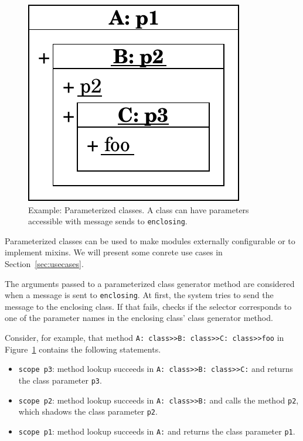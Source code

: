 \begin{figure}
	\includegraphics[scale=0.75]{nested_notation_params.pdf}
	\centering
	\caption[Example: Parameterized classes]{Example: Parameterized classes. A class can have parameters accessible with message sends to \texttt{enclosing}.}
	\label{fig:concept_param_classes}
\end{figure}

Parameterized classes can be used to make modules externally configurable or to implement mixins. We will present some conrete use cases in Section~\ref{sec:usecases}.

The arguments passed to a parameterized class generator method are considered when a message is sent to \texttt{enclosing}. At first, the system tries to send the message to the enclosing class. If that fails, \msname checks if the selector corresponds to one of the parameter names in the enclosing class' class generator method.

Consider, for example, that method \texttt{A: class>>B: class>>C: class>>foo} in Figure~\ref{fig:concept_param_classes} contains the following statements.
\begin{itemize}
	\item \texttt{scope p3}: method lookup succeeds in \texttt{A: class>>B: class>>C:} and returns the class parameter \texttt{p3}.
	\item \texttt{scope p2}: method lookup succeeds in \texttt{A: class>>B:} and calls the method \texttt{p2}, which shadows the class parameter \texttt{p2}.
	\item \texttt{scope p1}: method lookup succeeds in \texttt{A:} and returns the class parameter \texttt{p1}.
\end{itemize}

